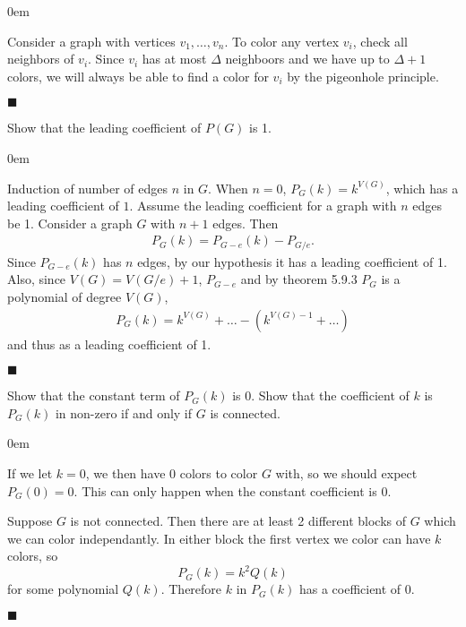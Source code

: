\documentclass[12pt]{article}
\renewcommand{\qed}{\hfill$\blacksquare$}
\renewenvironment{proof}{\vspace{1em}\begin{addmargin}[2em]{0em}\begin{newproof}}{\end{newproof}\end{addmargin}\qed}
\newenvironment{exercise}[2][Exercise]{\begin{trivlist}
\item[\hskip \labelsep {\bfseries #1} \hskip \labelsep {\bfseries #2.}]}{\end{trivlist}}
\begin{document}
\begin{proof}
	Consider a graph with vertices $v_1,\ldots,v_n$. To color any vertex $v_i$, check all neighbors of $v_i$. Since $v_i$ has at most $\Delta$ neighboors and we have up to $\Delta + 1$ colors, we will always be able to find a color for $v_i$ by the pigeonhole principle.
\end{proof}
\begin{exercise}{5.9.1 (2pt)}
	Show that the leading coefficient of $P(G)$ is 1.
\end{exercise}	
\begin{proof}
	Induction of number of edges $n$ in $G$. When $n = 0$, $P_G(k) = k^{V(G)}$, which has a leading coefficient of $1$. Assume the leading coefficient for a graph with $n$ edges be 1. Consider a graph $G$ with $n+1$ edges. Then
	\begin{align*}
		P_G(k) = P_{G - e}(k) - P_{G/e}.
	\end{align*}
	Since $P_{G - e}(k)$ has $n$ edges, by our hypothesis it has a leading coefficient of 1. Also, since $V(G) = V(G/e) + 1$, $P_{G - e}$ and by theorem 5.9.3 $P_G$ is a polynomial of degree $V(G)$,
	\begin{align*}
		P_G(k) = k^{V(G)} + \ldots - (k^{V(G) - 1} + \ldots)
	\end{align*}
	and thus as a leading coefficient of 1.
\end{proof} 
\begin{exercise}{5.9.3 (2pt)}
	Show that the constant term of $P_G(k)$ is 0. Show that the coefficient of $k$ is $P_G(k)$ in non-zero if and only if $G$ is connected.
\end{exercise}	
\begin{proof}
	If we let $k = 0$, we then have 0 colors to color $G$ with, so we should expect $P_G(0) = 0$. This can only happen when the constant coefficient is 0.

	Suppose $G$ is not connected. Then there are at least 2 different blocks of $G$ which we can color independantly. In either block the first vertex we color can have $k$ colors, so
	\[
		P_G(k) = k^2Q(k)
	\]
	for some polynomial $Q(k)$. Therefore $k$ in $P_G(k)$ has a coefficient of 0.
\end{proof}
\end{document}
